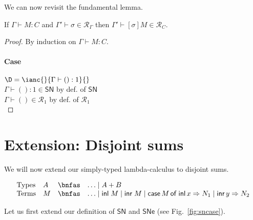 \documentclass{article}
\newcommand{\one}{1}
\newcommand{\SN}{\mathsf{SN}}
\newcommand{\SNe}{\mathsf{SNe}}
\newcommand{\denot}[1]{\mathcal{R}_{#1}}
\newcommand{\inden}[3]{#1 \vdash #2 \in \denot{#3}}
\begin{document}
We can now revisit the fundamental lemma.

 \begin{lemma}
 If $\Gamma \vdash M : C$ and $\inden{\Gamma'}{\sigma}{\Gamma}$
 then $\inden{\Gamma'}{[\sigma]M}{C}$.
 \end{lemma}
 \begin{proof}
 By induction on $\Gamma \vdash M : C$.

\paragraph{Case} $\D = \ianc{}{\Gamma \vdash () : \one}{}$
\\[1em]
$\Gamma \vdash () : \one \in \SN$ \hfill by def. of $\SN$\\
$\inden \Gamma {()} \one$ \hfill by def. of $\mathcal{R}_\one$\\

\end{proof}

\newpage

\renewcommand{\inl}{\textsf{inl}\;}
\renewcommand{\inr}{\textsf{inr}\;}
\newcommand{\caseof}[3]{\textsf{case}\,#1\,\textsf{of inl}\,x \Rightarrow #2 \mid \textsf{inr}\,y \Rightarrow #3}


\section{Extension: Disjoint sums}

We will now extend our simply-typed lambda-calculus to disjoint sums.

\[
\begin{array}{llcl}
\mbox{Types}  & A & \bnfas & \ldots \mid A + B\\
\mbox{Terms}  & M & \bnfas & \ldots \mid \inl M \mid \inr M \mid \caseof{M}{N_1}{N_2}
\end{array}
\]

Let us first extend our definition of $\SN$ and $\SNe$ (see Fig.~\ref{fig:sncase}).
\end{document}
